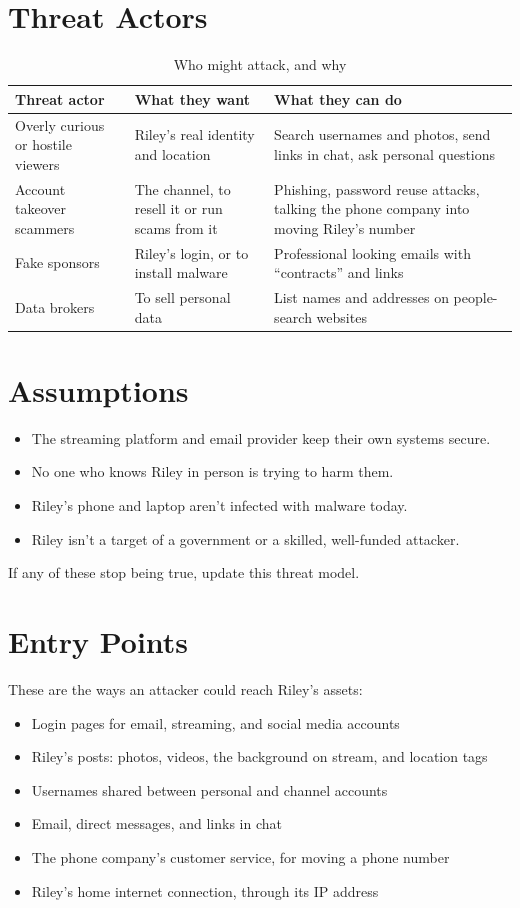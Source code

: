 \documentclass[11pt]{article}
\begin{document}
\section{Threat Actors}
\begin{table}[H]
\caption{Who might attack, and why}
\begin{tabular}{|m{}|m{}|m{}|}
\hline
\textbf{Threat actor} & \textbf{What they want} & \textbf{What they can do} \\
\hline
Overly curious or hostile viewers & Riley's real identity and location & Search usernames and photos, send links in chat, ask personal questions \\
\hline
Account takeover scammers & The channel, to resell it or run scams from it & Phishing, password reuse attacks, talking the phone company into moving Riley's number \\
\hline
Fake sponsors & Riley's login, or to install malware & Professional looking emails with ``contracts'' and links \\
\hline
Data brokers & To sell personal data & List names and addresses on people-search websites
\end{tabular}
\end{table}

\section{Assumptions}
\begin{itemize}
    \item The streaming platform and email provider keep their own systems secure.
    \item No one who knows Riley in person is trying to harm them.
    \item Riley's phone and laptop aren't infected with malware today.
    \item Riley isn't a target of a government or a skilled, well-funded attacker.
\end{itemize}
If any of these stop being true, update this threat model.

\section{Entry Points}
These are the ways an attacker could reach Riley's assets:
\begin{itemize}
    \item Login pages for email, streaming, and social media accounts
    \item Riley's posts: photos, videos, the background on stream, and location tags
    \item Usernames shared between personal and channel accounts
    \item Email, direct messages, and links in chat
    \item The phone company's customer service, for moving a phone number
    \item Riley's home internet connection, through its IP address
\end{itemize}
\end{document}
